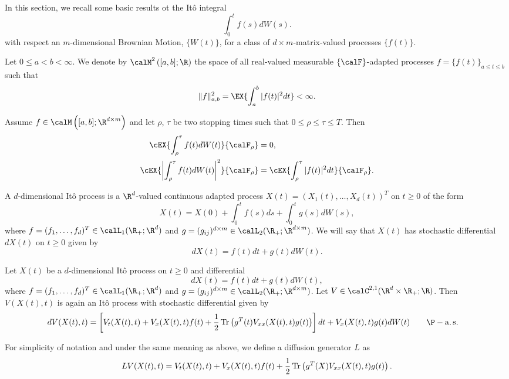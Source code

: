 
	In this section, we recall some basic results ot the It\^o integral
$$
	\int_{0}^{t}
		f(s)dW(s).
$$
with respect an $m$-dimensional Brownian Motion, $\{W(t)\}$, for a class of $d \times m$-matrix-valued processes
$\{f(t)\}$.
\begin{definition} %
	Let $0\leq a<b<\infty$. We denote by $\calM^2\left([a,b];\R \right)$ the space of all real-valued measurable
	$\{\calF\}$-adapted processes $f=\{f(t)\}_{a\leq t\leq b}$ such that
	$$
		\|f\|_{a,b}^2
			=\EX{
				\int_a^b |f(t)|^2dt
				}<\infty.
	$$
\end{definition}
\begin{thm}
	Assume $f\in \calM \left([a,b]; \R^{d\times m}\right)$ and let $\rho$, $\tau$ be two stopping times such that
	$0\leq \rho \leq \tau \leq T$. Then
	\begin{align*}
		\cEX{\int_{\rho}^{\tau} f(t) dW(t)}{\calF_{\rho}}
			& = 0,\\
		\cEX{\left|\int_{\rho}^{\tau} f(t)dW(t) \right|^2}{\calF_{\rho}}
			& = \cEX{\int_{\rho}^{\tau}|f(t)|^2dt }{\calF_{\rho}}.
	\end{align*}
\end{thm}
\begin{definition}[It\^o process]
	A $d$-dimensional It\^o process is a $\R^d$-valued continuous adapted
	process $X(t) = (X_1(t), \dots, X_d(t))^T$ on $t\geq 0$ of the form
	$$
		X(t) = X(0) +  \int_{0}^{t} f(s)ds + \int_{0}^{t} g(s)dW(s),
	$$
	where $f = (f_1,\ldots, f_d)^T \in  \calL_1(\R_+; \R^d)$ and 
	$g = (g_{ij})^{d\times m}\in \calL_2(\R_+; \R^{d\times m})$. We will say that $X(t)$ has stochastic differential 
	$dX(t)$ on $t \geq 0$ given by
	$$
		dX(t) = f(t) dt + g(t)dW(t).
	$$
\end{definition}
%
\begin{thm}
	Let $X(t)$ be a $d$-dimensional It\^o process on $t \geq 0$ and differential
	$$
		dX(t) = f(t) dt + g(t)dW(t),
	$$
	where $f = (f_1,\ldots, f_d)^T \in  \calL_1(\R_+; \R^d)$ and 
	$g = (g_{ij})^{d\times m}\in \calL_2(\R_+; \R^{d\times m})$.
	Let $V\in \calC^{2,1}(\R^d\times \R_+;\R)$. Then $V(X(t),t)$ is again an It\^o process with stochastic differential
	given by
	\begin{align*}
		dV(X(t),t) &=
			\left[
				V_t(X(t),t) + V_x(X(t),t)f(t)
				+\frac{1}{2}
				\Tr
					\left(
						g^T(t) V_{xx}(X(t),t)g(t)
					\right)
			\right]dt
			+
			V_x(X(t),t) g(t)dW(t) \qquad \P-\as
	\end{align*}
\end{thm}
For simplicity of notation and under the same meaning as above, we define a diffusion generator $L$ as
\begin{equation}\label{eqn:DifussionOperator}
LV(X(t),t)=
V_t(X(t),t) + V_x(X(t),t)f(t)
+\frac{1}{2}
\Tr
	\left(
		g^T(X) V_{xx}(X(t), t)g(t)
	\right).
\end{equation}
